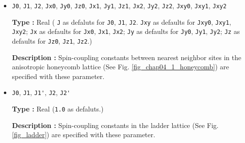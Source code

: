 \begin{itemize}
{\bf Type :} Real (\verb|J'|, \verb|Jxy'|, \verb|Jz'|, \verb|Jx'|, and \verb|Jy'|
are set to  \verb|0.0|,  \verb|J'|, \verb|J'|, \verb|Jxy'|, and \verb|Jxy'| as defaults.)

{\bf Description :} Spin-coupling constants between second nearest neighbor sites
(See Fig. \ref{fig_chap04_1_lattice}) are specified with these parameter.
They are set as 
\verb|J|, \verb|Jx|, \verb|Jy|, \verb|Jz|, and \verb|Jxy| are set.

\item \verb|J0|, \verb|J1|, \verb|J2|, \verb|Jx0|, \verb|Jy0|, \verb|Jz0|, 
  \verb|Jx1|, \verb|Jy1|, \verb|Jz1|, 
  \verb|Jx2|, \verb|Jy2|, \verb|Jz2|, \verb|Jxy0|, \verb|Jxy1|, \verb|Jxy2|

{\bf Type :} Real (
\verb|J| as defaluts for \verb|J0|, \verb|J1|, \verb|J2|. 
\verb|Jxy| as defaults for \verb|Jxy0|, \verb|Jxy1|,  \verb|Jxy2|;
\verb|Jx| as defaults for \verb|Jx0|, \verb|Jx1|, \verb|Jx2|;
\verb|Jy| as defaults for \verb|Jy0|, \verb|Jy1|, \verb|Jy2|;
\verb|Jz| as defaults for \verb|Jz0|, \verb|Jz1|, \verb|Jz2|.)

{\bf Description :} Spin-coupling constants between nearest neighbor sites
in the anisotropic honeycomb lattice
(See Fig. \ref{fig_chap04_1_honeycomb}) are specified with these parameter.

\item \verb|J0|, \verb|J1|, \verb|J1'|, \verb|J2|, \verb|J2'|

{\bf Type :} Real (\verb|1.0| as defaluts.)

{\bf Description :} Spin-coupling constants in the ladder lattice
(See Fig. \ref{fig_ladder}) are specified with these parameter.

\end{itemize}


